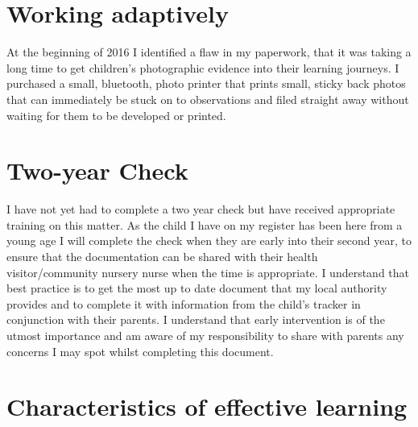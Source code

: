 \documentclass[10pt,a4paper]{report}
\begin{document}
\section{Working adaptively}

At the beginning of 2016 I identified a flaw in my paperwork, that it was taking a long time to get children's photographic evidence into their learning journeys. I purchased a small, bluetooth, photo printer that prints small, sticky back photos that can immediately be stuck on to observations and filed straight away without waiting for them to be developed or printed.

\section{Two-year Check}

I have not yet had to complete a two year check but have received appropriate training on this matter. As the child I have on my register has been here from a young age I will complete the check when they are early into their second year, to ensure that the documentation can be shared with their health visitor/community nursery nurse when the time is appropriate. I understand that best practice is to get the most up to date document that my local authority provides and to complete it with information from the child's tracker in conjunction with their parents. I understand that early intervention is of the utmost importance and am aware of my responsibility to share with parents any concerns I may spot whilst completing this document.

\section{Characteristics of effective learning}
\end{document}

